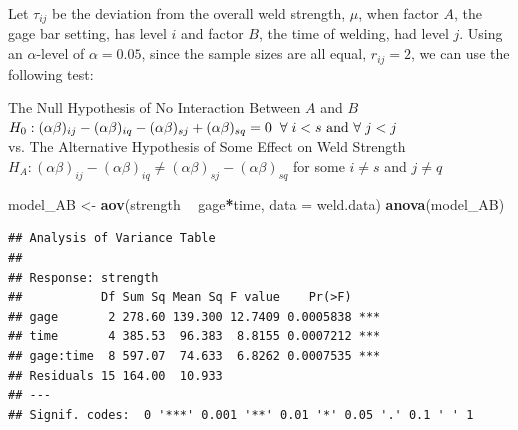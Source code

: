 \documentclass[12pt,]{article}
\newenvironment{Shaded}{\begin{snugshade}}{\end{snugshade}}
\newcommand{\KeywordTok}[1]{\textcolor[rgb]{0.13,0.29,0.53}{\textbf{#1}}}
\newcommand{\DataTypeTok}[1]{\textcolor[rgb]{0.13,0.29,0.53}{#1}}
\newcommand{\StringTok}[1]{\textcolor[rgb]{0.31,0.60,0.02}{#1}}
\newcommand{\OperatorTok}[1]{\textcolor[rgb]{0.81,0.36,0.00}{\textbf{#1}}}
\newcommand{\NormalTok}[1]{#1}
\begin{document}
Let \(\tau_{ij}\) be the deviation from the overall weld strength,
\(\mu\), when factor \(A\), the gage bar setting, has level \(i\) and
factor \(B\), the time of welding, had level \(j\). Using an
\(\alpha\)-level of \(\alpha = 0.05\), since the sample sizes are all
equal, \(r_{ij}=2\), we can use the following test:

\begin{center}
 The Null Hypothesis of No Interaction Between $A$ and $B$  
 $H_0 : (\alpha \beta)_{ij} - (\alpha \beta)_{iq} - (\alpha \beta)_{sj} + (\alpha \beta)_{sq}= 0 \hspace{.2cm }\forall \hspace{.1cm} i<s \text{ and }\forall  \hspace{.1cm} j<j$ \\
 vs. The Alternative Hypothesis of Some Effect on Weld Strength $H_A :  (\alpha \beta)_{ij} - (\alpha \beta)_{iq} \neq (\alpha \beta)_{sj} - (\alpha \beta)_{sq}$ for some $i\neq s$ and $j\neq q$ 
\end{center}

\begin{Shaded}
\end{Shaded}

\begin{Shaded}
\begin{Highlighting}[]
\NormalTok{model_AB <-}\StringTok{ }\KeywordTok{aov}\NormalTok{(strength }\OperatorTok{~}\StringTok{ }\NormalTok{gage}\OperatorTok{*}\NormalTok{time, }\DataTypeTok{data =}\NormalTok{ weld.data)}
\KeywordTok{anova}\NormalTok{(model_AB)}
\end{Highlighting}
\end{Shaded}

\begin{verbatim}
## Analysis of Variance Table
## 
## Response: strength
##           Df Sum Sq Mean Sq F value    Pr(>F)    
## gage       2 278.60 139.300 12.7409 0.0005838 ***
## time       4 385.53  96.383  8.8155 0.0007212 ***
## gage:time  8 597.07  74.633  6.8262 0.0007535 ***
## Residuals 15 164.00  10.933                      
## ---
## Signif. codes:  0 '***' 0.001 '**' 0.01 '*' 0.05 '.' 0.1 ' ' 1
\end{verbatim}
\end{document}

